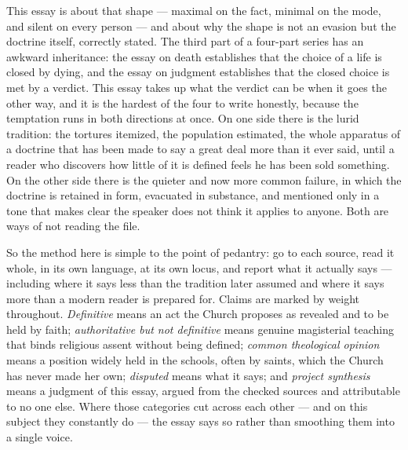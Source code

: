 This essay is about that shape --- maximal on the fact, minimal on the mode, and silent on every person --- and about why the shape is not an evasion but the doctrine itself, correctly stated. The third part of a four-part series has an awkward inheritance: the essay on death establishes that the choice of a life is closed by dying, and the essay on judgment establishes that the closed choice is met by a verdict. This essay takes up what the verdict can be when it goes the other way, and it is the hardest of the four to write honestly, because the temptation runs in both directions at once. On one side there is the lurid tradition: the tortures itemized, the population estimated, the whole apparatus of a doctrine that has been made to say a great deal more than it ever said, until a reader who discovers how little of it is defined feels he has been sold something. On the other side there is the quieter and now more common failure, in which the doctrine is retained in form, evacuated in substance, and mentioned only in a tone that makes clear the speaker does not think it applies to anyone. Both are ways of not reading the file.

So the method here is simple to the point of pedantry: go to each source, read it whole, in its own language, at its own locus, and report what it actually says --- including where it says less than the tradition later assumed and where it says more than a modern reader is prepared for. Claims are marked by weight throughout. \emph{Definitive} means an act the Church proposes as revealed and to be held by faith; \emph{authoritative but not definitive} means genuine magisterial teaching that binds religious assent without being defined; \emph{common theological opinion} means a position widely held in the schools, often by saints, which the Church has never made her own; \emph{disputed} means what it says; and \emph{project synthesis} means a judgment of this essay, argued from the checked sources and attributable to no one else. Where those categories cut across each other --- and on this subject they constantly do --- the essay says so rather than smoothing them into a single voice.

